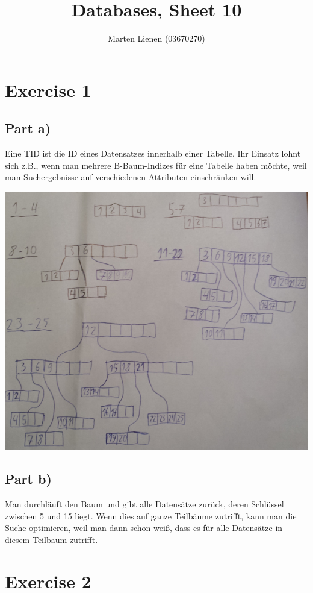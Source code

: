 \documentclass[10pt,a4paper]{article}
\title{Databases, Sheet 10}
\author{Marten Lienen (03670270)}
\begin{document}
\maketitle

\section*{Exercise 1}

\subsection*{Part a)}

Eine TID ist die ID eines Datensatzes innerhalb einer Tabelle.
Ihr Einsatz lohnt sich z.B., wenn man mehrere B-Baum-Indizes für eine Tabelle haben möchte, weil man Suchergebnisse auf verschiedenen Attributen einschränken will.

\includegraphics[width=\textwidth]{sheet-10/exercise-1-a}

\subsection*{Part b)}

Man durchläuft den Baum und gibt alle Datensätze zurück, deren Schlüssel zwischen 5 und 15 liegt.
Wenn dies auf ganze Teilbäume zutrifft, kann man die Suche optimieren, weil man dann schon weiß, dass es für alle Datensätze in diesem Teilbaum zutrifft.

\section*{Exercise 2}
\end{document}
